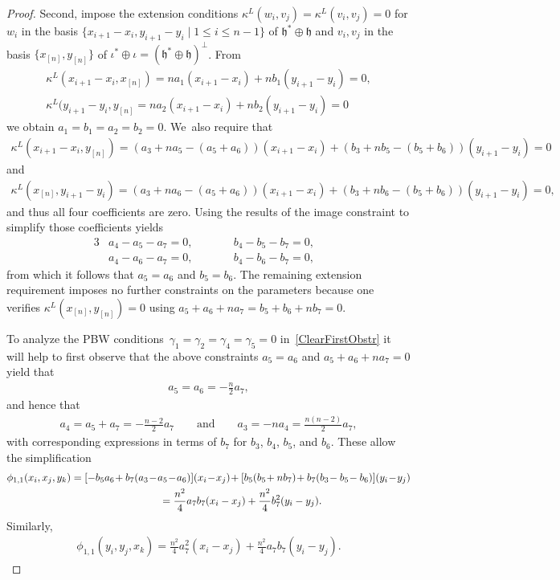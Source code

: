 \documentclass[10pt,a4paper]{amsart}
\numberwithin{equation}{section}
\begin{document}
\begin{proof}
Second, impose the extension conditions $\kappa^L(w_i,v_j)=\kappa^L(v_i,v_j)=0$ for
$w_i$ in the basis $\{x_{i+1}-x_i, y_{i+1}-y_i \mid 1 \leq i \leq n-1 \}$
of $\mathfrak{h}^*\oplus\mathfrak{h}$ and $v_i, v_j$ in the basis $\{x_{[n]},y_{[n]}\}$
of $\iota^* \oplus \iota=(\mathfrak{h}^*\oplus\mathfrak{h})^\perp$. From
\begin{gather*}
\kappa^L(x_{i+1}-x_i,x_{[n]})=na_1(x_{i+1}-x_i)+nb_1(y_{i+1}-y_i)=0,
\\
\kappa^L(y_{i+1}-y_i,y_{[n]}=na_2(x_{i+1}-x_i)+nb_2(y_{i+1}-y_i)=0
\end{gather*}
we obtain $a_1=b_1=a_2=b_2=0$. We~also require that
\begin{gather*}
\kappa^L(x_{i+1}\!-x_i,y_{[n]})=(a_3\!+na_5\!-(a_5\!+a_6))(x_{i+1}\!-x_i)
\!+(b_3\!+nb_5\!-(b_5\!+b_6))(y_{i+1}\!-y_i)=0
\end{gather*}
and
\begin{gather*}
\kappa^L(x_{[n]},y_{i+1}\!-y_i)=(a_3\!+na_6\!-(a_5\!+a_6))(x_{i+1}\!-x_i)
\!+(b_3\!+nb_6\!-(b_5\!+b_6))(y_{i+1}\!-y_i)=0,
\end{gather*}
and thus all four coefficients are zero. Using the results of the image constraint
to simplify those coefficients yields
\begin{alignat*}{3}
&a_4-a_5-a_7=0,\qquad&& b_4-b_5-b_7=0,& \\
&a_4-a_6-a_7=0,\qquad && b_4-b_6-b_7=0,&
\end{alignat*}
from which it follows that $a_5=a_6$ and $b_5=b_6$.
The remaining extension requirement imposes no further constraints on the parameters because
one verifies $\kappa^L(x_{[n]},y_{[n]})=0$ using $a_5+a_6+na_7=b_5+b_6+nb_7=0$.

To analyze the PBW conditions~$\gamma_1=\gamma_2=\gamma_4=\gamma_5=0$ in~\eqref{ClearFirstObstr}
it will help to first observe that the above constraints $a_5=a_6$ and $a_5+a_6+na_7=0$
yield that
\begin{gather*}
a_5=a_6=-\frac{n}{2}a_7,
\end{gather*}
and hence that
\begin{gather*}
a_4=a_5+a_7=-\frac{n-2}{2} a_7\qquad \text{and} \qquad
a_3=-na_4=\frac{n(n-2)}{2}a_7,
\end{gather*}
with corresponding expressions in terms of $b_7$ for $b_3$, $b_4$, $b_5$, and $b_6$.
These allow the simplification
\begin{gather*}
\phi_{1,1}(x_i,x_j,y_k)
=[-b_5a_6\!+b_7(a_3\!-\!a_5\!-\!a_6)](x_i\!-\!x_j)\!+[b_5(b_5\!+nb_7)\!+b_7(b_3\!-b_5\!-b_6)](y_i\!-\!y_j)
\\ \hphantom{\phi_{1,1}(x_i,x_j,y_k)}
{}=\frac{n^2}{4}a_7b_7(x_i-x_j)+\frac{n^2}{4}b_7^2(y_i-y_j).
\end{gather*}
Similarly,
\begin{gather*}
\phi_{1,1}(y_i,y_j,x_k)=\frac{n^2}{4}a_7^2(x_i-x_j)+\frac{n^2}{4}a_7b_7(y_i-y_j).
\end{gather*}


\end{proof}
\end{document}
